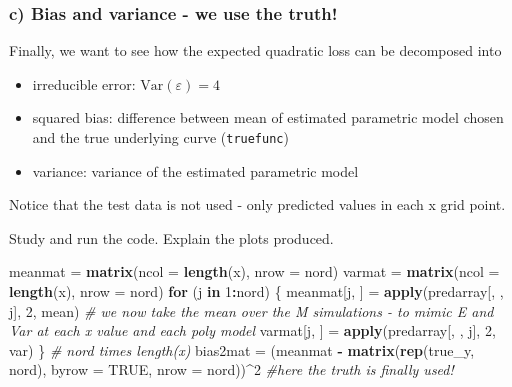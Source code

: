 \documentclass[]{article}
\newenvironment{Shaded}{\begin{snugshade}}{\end{snugshade}}
\newcommand{\KeywordTok}[1]{\textcolor[rgb]{0.13,0.29,0.53}{\textbf{#1}}}
\newcommand{\DataTypeTok}[1]{\textcolor[rgb]{0.13,0.29,0.53}{#1}}
\newcommand{\DecValTok}[1]{\textcolor[rgb]{0.00,0.00,0.81}{#1}}
\newcommand{\StringTok}[1]{\textcolor[rgb]{0.31,0.60,0.02}{#1}}
\newcommand{\CommentTok}[1]{\textcolor[rgb]{0.56,0.35,0.01}{\textit{#1}}}
\newcommand{\OtherTok}[1]{\textcolor[rgb]{0.56,0.35,0.01}{#1}}
\newcommand{\ControlFlowTok}[1]{\textcolor[rgb]{0.13,0.29,0.53}{\textbf{#1}}}
\newcommand{\OperatorTok}[1]{\textcolor[rgb]{0.81,0.36,0.00}{\textbf{#1}}}
\newcommand{\NormalTok}[1]{#1}
\providecommand{\tightlist}{%
  \setlength{\itemsep}{0pt}\setlength{\parskip}{0pt}}
\begin{document}
\subsubsection{c) Bias and variance - we use the
truth!}\label{c-bias-and-variance---we-use-the-truth}

Finally, we want to see how the expected quadratic loss can be
decomposed into

\begin{itemize}
\tightlist
\item
  irreducible error: \(\text{Var}(\varepsilon)=4\)
\item
  squared bias: difference between mean of estimated parametric model
  chosen and the true underlying curve (\texttt{truefunc})
\item
  variance: variance of the estimated parametric model
\end{itemize}

Notice that the test data is not used - only predicted values in each x
grid point.

Study and run the code. Explain the plots produced.

\begin{Shaded}
\begin{Highlighting}[]
\NormalTok{meanmat =}\StringTok{ }\KeywordTok{matrix}\NormalTok{(}\DataTypeTok{ncol =} \KeywordTok{length}\NormalTok{(x), }\DataTypeTok{nrow =}\NormalTok{ nord)}
\NormalTok{varmat =}\StringTok{ }\KeywordTok{matrix}\NormalTok{(}\DataTypeTok{ncol =} \KeywordTok{length}\NormalTok{(x), }\DataTypeTok{nrow =}\NormalTok{ nord)}
\ControlFlowTok{for}\NormalTok{ (j }\ControlFlowTok{in} \DecValTok{1}\OperatorTok{:}\NormalTok{nord) \{}
\NormalTok{    meanmat[j, ] =}\StringTok{ }\KeywordTok{apply}\NormalTok{(predarray[, , j], }\DecValTok{2}\NormalTok{, mean)  }\CommentTok{# we now take the mean over the M simulations - to mimic E and Var at each x value and each poly model}
\NormalTok{    varmat[j, ] =}\StringTok{ }\KeywordTok{apply}\NormalTok{(predarray[, , j], }\DecValTok{2}\NormalTok{, var)}
\NormalTok{\}}
\CommentTok{# nord times length(x)}
\NormalTok{bias2mat =}\StringTok{ }\NormalTok{(meanmat }\OperatorTok{-}\StringTok{ }\KeywordTok{matrix}\NormalTok{(}\KeywordTok{rep}\NormalTok{(true_y, nord), }\DataTypeTok{byrow =} \OtherTok{TRUE}\NormalTok{, }\DataTypeTok{nrow =}\NormalTok{ nord))}\OperatorTok{^}\DecValTok{2}  \CommentTok{#here the truth is finally used!}
\end{Highlighting}
\end{Shaded}
\end{document}

